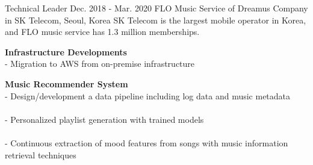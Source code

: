\begin{cventries}
    \cventry
        {Technical Leader} %
        {Dec. 2018 - Mar. 2020} %
        {FLO Music Service of Dreamus Company in SK Telecom, } %
        {Seoul, Korea}%
        { %
            SK Telecom is the largest mobile operator in Korea, and FLO music service has 1.3 million memberships.
        }
        { %
            \begin{cvitems}
                \item {
                    {\bf Infrastructure Developments} \\
                    - Migration to AWS from on-premise infrastructure \\
                         \nn
                }
                \item {
                    {\bf Music Recommender System} \\
                    - Design/development a data pipeline including log data and music metadata \\
                         \\
                    - Personalized playlist generation with trained models \\
                         \\
                    - Continuous extraction of mood features from songs with music information retrieval techniques \\
                         \nn
                }
            \end{cvitems}
        }


\end{cventries}
